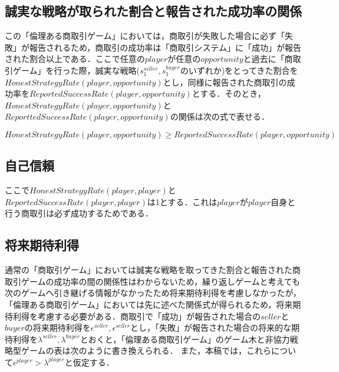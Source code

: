 \clearpage

\subsection{誠実な戦略が取られた割合と報告された成功率の関係}
この「倫理ある商取引ゲーム」においては，商取引が失敗した場合に必ず「失敗」が報告されるため，商取引の成功率は「商取引システム」に「成功」が報告された割合以上である．ここで任意の$ player $が任意の$ opportunity $と過去に「商取引ゲーム」を行った際，誠実な戦略($ s^{seller}_1, s^{buyer}_1 $のいずれか)をとってきた割合を$ HonestStrategyRate(player, opportunity) $とし，同様に報告された商取引の成功率を$ ReportedSuccessRate(player, opportunity) $とする．そのとき，$ HonestStrategyRate(player, opportunity) $と$ ReporttedSuccessRate(player, opportunity) $の関係は次の式で表せる．


\begin{equation}
  HonestStrategyRate(player, opportunity) \geq ReportedSuccessRate(player, opportunity)
\end{equation}

\subsection{自己信頼}
ここで$ HonestStrategyRate(player, player) $と$ ReportedSuccessRate(player, player) $は1とする．これは$ player $が$ player $自身と行う商取引は必ず成功するためである．

\subsection{将来期待利得}
通常の「商取引ゲーム」においては誠実な戦略を取ってきた割合と報告された商取引ゲームの成功率の間の関係性はわからないため，繰り返しゲームと考えても次のゲームへ引き継げる情報がなかったため将来期待利得を考慮しなかったが，「倫理ある商取引ゲーム」においては先に述べた関係式が得られるため，将来期待利得を考慮する必要がある．商取引で「成功」が報告された場合の$ seller $と$ buyer $の将来期待利得を$ \epsilon^{seller}, \epsilon^{seller} $とし，「失敗」が報告された場合の将来的な期待利得を$ \lambda^{seller}, \lambda^{buyer} $とおくと，「倫理ある商取引ゲーム」のゲーム木と非協力戦略型ゲームの表は次のように書き換えられる．
また，本稿では，これらについて$ \epsilon^{player} > \lambda^{player} $と仮定する．
